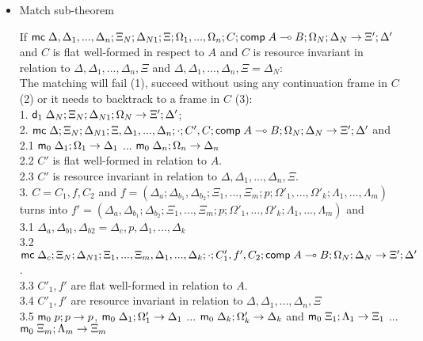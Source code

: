 \begin{itemize}
   \item Match sub-theorem

If $\mathsf{mc} \; \Delta, \Delta_1, ..., \Delta_n; \Xi_N; \Delta_{N1}; \Xi; \Omega_1, ..., \Omega_n; C; \mathsf{comp} \; A \multimap B; \Omega_N; \Delta_N \rightarrow \Xi'; \Delta'$  and $C$ is flat well-formed in respect to $A$ and $C$ is resource invariant in relation to $\Delta, \Delta_1, ..., \Delta_n, \Xi$ and $\Delta, \Delta_1, ..., \Delta_n, \Xi = \Delta_N$:\\

The matching will fail (1), succeed without using any continuation frame in $C$ (2) or it needs to backtrack to a frame in $C$ (3):\\
1. \hspace{1cm} $\mathsf{d}_1 \; \Delta_N; \Xi_N; \Delta_{N1}; \Omega_N \rightarrow \Xi'; \Delta'$; \\
2. \hspace{1cm} $\mathsf{mc} \; \Delta; \Xi_N; \Delta_{N1}; \Xi, \Delta_1, ..., \Delta_n; \cdot; C', C; \mathsf{comp} \; A \multimap B; \Omega_N; \Delta_N \rightarrow \Xi'; \Delta'$ and\\
2.1 \hspace{2cm} $\mathsf{m}_0 \; \Delta_1; \Omega_1 \rightarrow \Delta_1$ ... $\mathsf{m}_0 \; \Delta_n; \Omega_n \rightarrow \Delta_n$\\
2.2 \hspace{2cm} $C'$ is flat well-formed in relation to $A$. \\
2.3 \hspace{2cm} $C'$ is resource invariant in relation to $\Delta, \Delta_1, ..., \Delta_n, \Xi$.\\
3. \hspace{1cm} $C = C_1, f, C_2$ and $f = (\Delta_a; \Delta_{b_1}, \Delta_{b_2}; \Xi_1, ..., \Xi_m; p; \Omega'_1, ..., \Omega'_k; \Lambda_1, ..., \Lambda_m)$ turns into $f' = (\Delta_a, \Delta_{b_1}; \Delta_{b_2}; \Xi_1, ..., \Xi_m; p; \Omega'_1, ..., \Omega'_k; \Lambda_1, ..., \Lambda_m)$ and\\
3.1 \hspace{2cm} $\Delta_a, \Delta_{b1}, \Delta_{b2} = \Delta_c, p, \Delta_1, ..., \Delta_k$ \\
3.2 \hspace{2cm} $\mathsf{mc} \; \Delta_c; \Xi_N; \Delta_{N1}; \Xi_1, ..., \Xi_m, \Delta_1, ..., \Delta_k; \cdot; C'_1, f', C_2; \mathsf{comp} \; A \multimap B; \Omega_N; \Delta_N \rightarrow \Xi'; \Delta'$.\\
3.3 \hspace{2cm} $C'_1, f'$ are flat well-formed in relation to $A$. \\
3.4 \hspace{2cm} $C'_1, f'$ are resource invariant in relation to $\Delta, \Delta_1, ..., \Delta_n, \Xi$ \\
3.5 \hspace{2cm} $\mathsf{m}_0 \; p; p \rightarrow p$, $\mathsf{m}_0 \; \Delta_1; \Omega'_1 \rightarrow \Delta_1$ ... $\mathsf{m}_0 \; \Delta_k; \Omega'_k \rightarrow \Delta_k$ and $\mathsf{m}_0 \; \Xi_1; \Lambda_1 \rightarrow \Xi_1$ ... $\mathsf{m}_0 \; \Xi_m; \Lambda_m \rightarrow \Xi_m$\\


\end{itemize}

